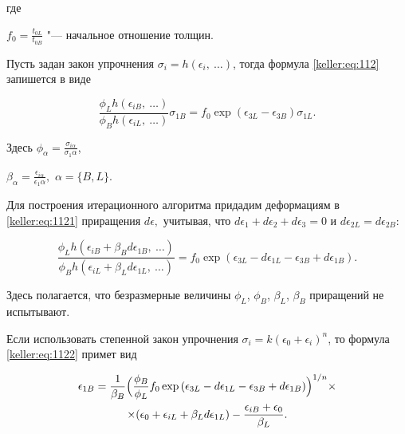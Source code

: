 где 

$f_0 = \frac{t_{0L}}{t_{0B}}$ "--- начальное отношение толщин. 

Пусть задан закон упрочнения $\sigma_i = h\left( \epsilon_i,\ \dots \right)$, тогда формула \eqref{keller:eq:112} запишется в виде

\begin{equation}

\label{keller:eq:1121}

\frac{\phi_L h\left( \epsilon_{iB},\ \dots \right)}{\phi_B h\left( \epsilon_{iL},\ \dots \right)}\sigma_{1B} = f_0\exp\left( \epsilon_{3L} - \epsilon_{3B} \right)\sigma_{1L}.

\end{equation} 

Здесь $\phi_{\alpha} = \frac{\sigma_{i \alpha}}{\sigma_1 \alpha}$, 

$\beta_{\alpha} = \frac{\epsilon_{i \alpha}}{\epsilon_1 \alpha},$ $\alpha=\{B,L\}.$ 

Для построения итерационного алгоритма придадим деформациям в \eqref{keller:eq:1121} приращения $d\epsilon,$ учитывая, что $d\epsilon_1 + d\epsilon_2 + d\epsilon_3 = 0$ и $d\epsilon_{2L} = d\epsilon_{2B}$:

\begin{equation}\label{keller:eq:1122}

\frac{\phi_L h\left( \epsilon_{iB} + \beta_B d\epsilon_{1B},\ \dots \right)}{\phi_B h\left( \epsilon_{iL} + \beta_L d\epsilon_{1L},\ \dots \right)} = f_0\exp\left( \epsilon_{3L} - d\epsilon_{1L} - \epsilon_{3B} + d\epsilon_{1B} \right).

\end{equation} 

Здесь полагается, что безразмерные величины $\phi_L$, $\phi_B$, $\beta_L$, $\beta_B$ приращений не испытывают. 

Если использовать степенной закон упрочнения $\sigma_i = k \left( \epsilon_0 + \epsilon_i \right)^n$, то формула  \eqref{keller:eq:1122} примет вид

\begin{multline}

\epsilon_{1B} = \frac{1}{\beta_B} \Bigl( \frac{\phi_B}{\phi_L} f_0 \exp\left( \epsilon_{3L} - d\epsilon_{1L} - \epsilon_{3B} + d\epsilon_{1B}  \right)  \Bigr)^{1/n} \times\\

\times( \epsilon_0 + \epsilon_{iL} + \beta_L d\epsilon_{1L} ) - \frac{\epsilon_{iB} + \epsilon_0}{\beta_L}.

\end{multline}





